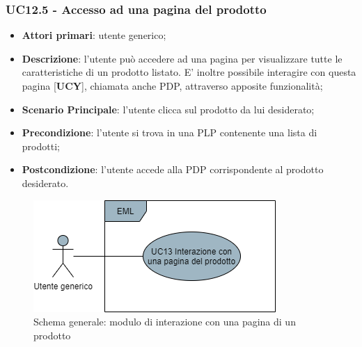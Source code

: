 \subsubsection{UC12.5 - Accesso ad una pagina del prodotto}
\begin{itemize}
\item \textbf{Attori primari}: utente generico;
\item \textbf{Descrizione}: l'utente può accedere ad una pagina per visualizzare tutte le caratteristiche di un prodotto listato. E' inoltre possibile interagire con questa pagina [\textbf{UCY}], chiamata anche PDP, attraverso apposite funzionalità;
\item \textbf{Scenario Principale}: l'utente clicca sul prodotto da lui desiderato;
\item \textbf{Precondizione}: l'utente si trova in una PLP contenente una lista di prodotti;
\item \textbf{Postcondizione}: l'utente accede alla PDP corrispondente al prodotto desiderato.
\end{itemize}
\begin{figure}[H]
\centering
\includegraphics[scale=0.6]{res/UseCase/Immagini/InterazionePaginaProdottoGenerale}
\caption{Schema generale: modulo di interazione con una pagina di un prodotto}
\end{figure}
